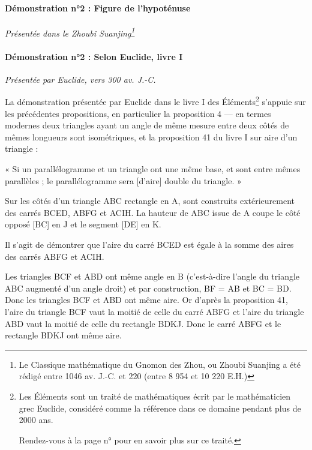 \documentclass[a4paper, twoside]{article}
\begin{document}
\newpage

\paragraph*{Démonstration n°2 : Figure de l'hypoténuse}

\textit{Présentée dans le Zhoubi Suanjing\footnote{
	Le Classique mathématique du Gnomon des Zhou, ou Zhoubi Suanjing 
	a été rédigé entre 1046 av. J.-C. et 220 (entre 8 954 et 10 220 E.H.)}}





\paragraph*{Démonstration n°2 : Selon Euclide, livre I}

\textit{Présentée par Euclide, vers 300 av. J.-C.}






La démonstration présentée par Euclide dans le livre I des Éléments\footnote{
	Les Éléments sont un traité de mathématiques écrit par le mathématicien grec Euclide, 
	considéré comme la référence dans ce domaine pendant plus de 2000 ans.

	Rendez-vous à la page n°\pageref*{euclide_element} pour en savoir plus sur ce traité. 
} 
s’appuie sur les précédentes propositions, en particulier la proposition 4 — en termes modernes deux triangles ayant un angle de même mesure entre deux côtés de mêmes longueurs sont isométriques, et la proposition 41 du livre I sur aire d'un triangle :

    « Si un parallélogramme et un triangle ont une même base, et sont entre mêmes parallèles ; le parallélogramme sera [d’aire] double du triangle. »

Sur les côtés d’un triangle ABC rectangle en A, sont construits extérieurement des carrés BCED, ABFG et ACIH. La hauteur de ABC issue de A coupe le côté opposé [BC] en J et le segment [DE] en K.

Il s’agit de démontrer que l’aire du carré BCED est égale à la somme des aires des carrés ABFG et ACIH.

Les triangles BCF et ABD ont même angle en B (c’est-à-dire l’angle du triangle ABC augmenté d’un angle droit) et par construction, BF = AB et BC = BD. Donc les triangles BCF et ABD ont même aire. Or d’après la proposition 41, l’aire du triangle BCF vaut la moitié de celle du carré ABFG et l’aire du triangle ABD vaut la moitié de celle du rectangle BDKJ. Donc le carré ABFG et le rectangle BDKJ ont même aire.
\end{document}
